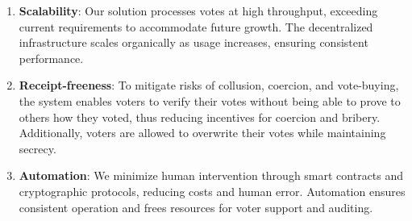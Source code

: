 \begin{enumerate}
	\item \textbf{Scalability}: Our solution processes votes at high throughput, exceeding current requirements to accommodate future growth. The decentralized infrastructure scales organically as usage increases, ensuring consistent performance.
	
	\item \textbf{Receipt-freeness}: To mitigate risks of collusion, coercion, and vote-buying, the system enables voters to verify their votes without being able to prove to others how they voted, thus reducing incentives for coercion and bribery. Additionally, voters are allowed to overwrite their votes while maintaining secrecy.
	
	\item \textbf{Automation}: We minimize human intervention through smart contracts and cryptographic protocols, reducing costs and human error. Automation ensures consistent operation and frees resources for voter support and auditing.
\end{enumerate}
